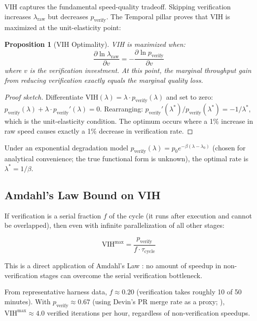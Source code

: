 \documentclass[11pt, a4paper]{googledeepmind}
\newtheorem{proposition}{Proposition}[section]
\begin{document}
VIH captures the fundamental speed-quality tradeoff. Skipping verification increases $\lambda_{\text{raw}}$ but decreases $p_{\text{verify}}$. The Temporal pillar proves that VIH is maximized at the unit-elasticity point:

\begin{proposition}[VIH Optimality]
\label{prop:vih-optimal}
VIH is maximized when:
\begin{equation}
    \frac{\partial \ln \lambda_{\text{raw}}}{\partial v} = -\frac{\partial \ln p_{\text{verify}}}{\partial v}
\end{equation}
where $v$ is the verification investment. At this point, the marginal throughput gain from reducing verification exactly equals the marginal quality loss.
\end{proposition}

\begin{proof}[Proof sketch]
Differentiate $\text{VIH}(\lambda) = \lambda \cdot p_{\mathrm{verify}}(\lambda)$ and set to zero: $p_{\mathrm{verify}}(\lambda) + \lambda \cdot p_{\mathrm{verify}}'(\lambda) = 0$. Rearranging: $p_{\mathrm{verify}}'(\lambda^*)/p_{\mathrm{verify}}(\lambda^*) = -1/\lambda^*$, which is the unit-elasticity condition. The optimum occurs where a 1\% increase in raw speed causes exactly a 1\% decrease in verification rate.
\end{proof}

Under an exponential degradation model $p_{\mathrm{verify}}(\lambda) = p_0 e^{-\beta(\lambda - \lambda_0)}$ (chosen for analytical convenience; the true functional form is unknown), the optimal rate is $\lambda^* = 1/\beta$.

\subsection{Amdahl's Law Bound on VIH}

If verification is a serial fraction $f$ of the cycle (it runs after execution and cannot be overlapped), then even with infinite parallelization of all other stages:

\begin{equation}
    \text{VIH}^{\max} = \frac{p_{\text{verify}}}{f \cdot \tau_{\text{cycle}}}
\end{equation}

This is a direct application of Amdahl's Law \citep{amdahl1967validity}: no amount of speedup in non-verification stages can overcome the serial verification bottleneck.

From representative harness data, $f \approx 0.20$ (verification takes roughly 10 of 50 minutes). With $p_{\text{verify}} \approx 0.67$ (using Devin's PR merge rate as a proxy; \citealt{cognition2025devin}), $\text{VIH}^{\max} \approx 4.0$ verified iterations per hour, regardless of non-verification speedups.
\end{document}
